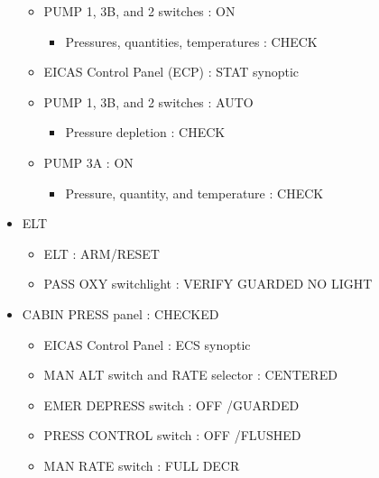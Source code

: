 \begin{itemize}
\begin{itemize}
\item PUMP 1, 3B, and 2 switches : ON

\begin{itemize}
\item Pressures, quantities, temperatures : CHECK

\end{itemize}

\item EICAS Control Panel (ECP) : STAT synoptic

\item PUMP 1, 3B, and 2 switches : AUTO

\begin{itemize}
\item Pressure depletion : CHECK

\end{itemize}

\item PUMP 3A : ON

\begin{itemize}
\item Pressure, quantity, and temperature : CHECK

\end{itemize}

\end{itemize}

\item ELT

\begin{itemize}
\item ELT : ARM\slash RESET

\item PASS OXY switchlight : VERIFY GUARDED NO LIGHT

\end{itemize}

\item CABIN PRESS panel : CHECKED

\begin{itemize}
\item EICAS Control Panel : ECS synoptic

\item MAN ALT switch and RATE selector : CENTERED

\item EMER DEPRESS switch : OFF \slash  GUARDED

\item PRESS CONTROL switch : OFF \slash  FLUSHED

\item MAN RATE switch : FULL DECR


\end{itemize}
\end{itemize}
